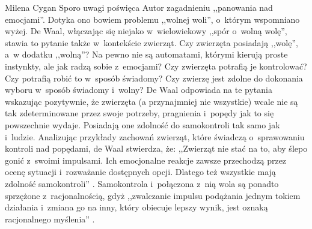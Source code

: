 \begin{newrevplenv}{Milena Cygan}
Sporo uwagi poświęca Autor zagadnieniu ,,panowania nad emocjami''. Dotyka ono bowiem problemu ,,wolnej woli'', o~którym wspomniano wyżej. De Waal, włączając się niejako w~wielowiekowy ,,spór o~wolną wolę'', stawia to pytanie także w~kontekście zwierząt. Czy zwierzęta posiadają ,,wolę'', a~w dodatku ,,wolną''? Na pewno nie są automatami, którymi kierują proste instynkty, ale jak radzą sobie z~emocjami? Czy zwierzęta potrafią je kontrolować? Czy potrafią robić to w~sposób świadomy? Czy zwierzę jest zdolne do dokonania wyboru w~sposób świadomy i~wolny? De Waal odpowiada na te pytania wskazując pozytywnie, że zwierzęta (a przynajmniej nie wszystkie) wcale nie są tak zdeterminowane przez swoje potrzeby, pragnienia i~popędy jak to się powszechnie wydaje. Posiadają one zdolność do samokontroli tak samo jak i~ludzie. Analizując przykłady zachowań zwierząt, które świadczą o~sprawowaniu kontroli nad popędami, de Waal stwierdza, że: ,,Zwierząt nie stać na to, aby ślepo gonić z~swoimi impulsami. Ich emocjonalne reakcje zawsze przechodzą przez ocenę sytuacji i~rozważanie dostępnych opcji. Dlatego też wszystkie mają zdolność samokontroli''
\parencite[][s.~279]{waal_ostatni_2019}. %
 Samokontrola i~połączona z~nią wola są ponadto sprzężone z~racjonalnością, gdyż ,,zwalczanie impulsu podążania jednym tokiem działania i~zmiana go na inny, który obiecuje lepszy wynik, jest oznaką racjonalnego myślenia'' 
\parencite[][s.~279]{waal_ostatni_2019}.%



\end{newrevplenv}
